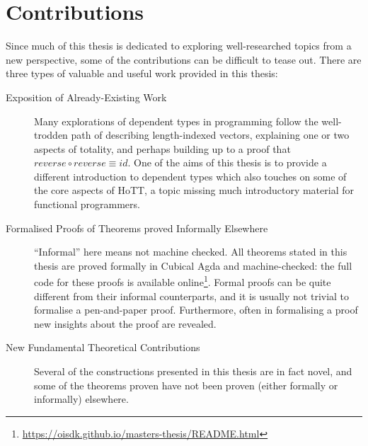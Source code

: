 \section{Contributions}
Since much of this thesis is dedicated to exploring well-researched topics from
a new perspective, some of the contributions can be difficult to tease out.
There are three types of valuable and useful work provided in this thesis:
\begin{description}
  \item[Exposition of Already-Existing Work]
    Many explorations of dependent types in programming follow the well-trodden
    path of describing length-indexed vectors, explaining one or two aspects of
    totality, and perhaps building up to a proof that \(\mathit{reverse} \circ
    \mathit{reverse} \equiv \mathit{id}\).
    One of the aims of this thesis is to provide a different introduction to
    dependent types which also touches on some of the core aspects of HoTT, a
    topic missing much introductory material for functional programmers.
  \item[Formalised Proofs of Theorems proved Informally Elsewhere]
    ``Informal'' here means not machine checked.
    All theorems stated in this thesis are proved formally in Cubical Agda and
    machine-checked: the full code for these proofs is available
    online\footnote{\url{https://oisdk.github.io/masters-thesis/README.html}}.
    Formal proofs can be quite different from their informal counterparts, and
    it is usually not trivial to formalise a pen-and-paper proof.
    Furthermore, often in formalising a proof new insights about the proof are
    revealed.
  \item[New Fundamental Theoretical Contributions]
    Several of the constructions presented in this thesis are in fact novel, and
    some of the theorems proven have not been proven (either formally or
    informally) elsewhere.
\end{description}

